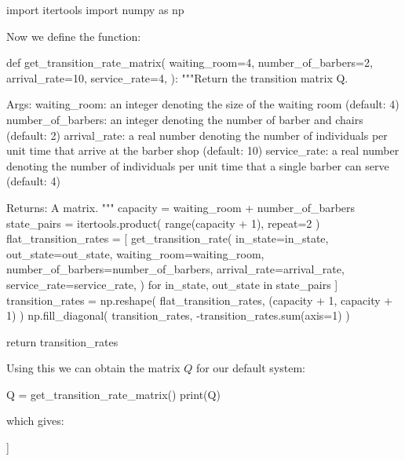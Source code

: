 \begin{pyin}
import itertools
import numpy as np
\end{pyin}

Now we define the function:

\begin{pyin}
def get_transition_rate_matrix(
    waiting_room=4,
    number_of_barbers=2,
    arrival_rate=10,
    service_rate=4,
):
    """Return the transition matrix Q.

    Args:
        waiting_room: an integer denoting the size of the
                      waiting room (default: 4)
        number_of_barbers: an integer denoting the number of
                           barber and chairs (default: 2)
        arrival_rate: a real number denoting the number of
                      individuals per unit time that arrive at
                      the barber shop (default: 10)
        service_rate: a real number denoting the number of
                      individuals per unit time that a single
                      barber can serve (default: 4)

    Returns:
        A matrix.
    """
    capacity = waiting_room + number_of_barbers
    state_pairs = itertools.product(
        range(capacity + 1), repeat=2
    )
    flat_transition_rates = [
        get_transition_rate(
            in_state=in_state,
            out_state=out_state,
            waiting_room=waiting_room,
            number_of_barbers=number_of_barbers,
            arrival_rate=arrival_rate,
            service_rate=service_rate,
        )
        for in_state, out_state in state_pairs
    ]
    transition_rates = np.reshape(
        flat_transition_rates, (capacity + 1, capacity + 1)
    )
    np.fill_diagonal(
        transition_rates, -transition_rates.sum(axis=1)
    )

    return transition_rates
\end{pyin}

Using this we can obtain the matrix \(Q\) for our default system:

\begin{pyin}
Q = get_transition_rate_matrix()
print(Q)
\end{pyin}

which gives:

\begin{pyout}
[[-10  10   0   0   0   0   0]
 [  4 -14  10   0   0   0   0]
 [  0   8 -18  10   0   0   0]
 [  0   0   8 -18  10   0   0]
 [  0   0   0   8 -18  10   0]
 [  0   0   0   0   8 -18  10]
 [  0   0   0   0   0   8  -8]]
\end{pyout}

